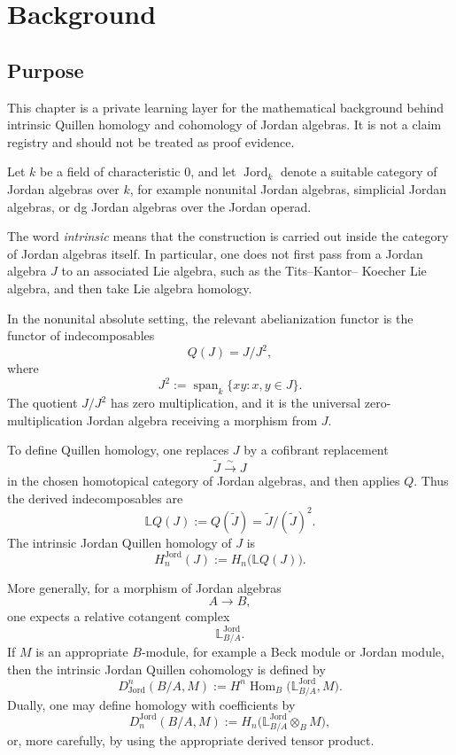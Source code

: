 \chapter{Background}

\section{Purpose}

This chapter is a private learning layer for the mathematical background behind
intrinsic Quillen homology and cohomology of Jordan algebras. It is not a claim
registry and should not be treated as proof evidence.

\begin{note}
  Let \(k\) be a field of characteristic \(0\), and let
  \(\operatorname{Jord}_k\) denote a suitable category of Jordan algebras over
  \(k\), for example nonunital Jordan algebras, simplicial Jordan algebras, or
  dg Jordan algebras over the Jordan operad.

  The word \emph{intrinsic} means that the construction is carried out inside the
  category of Jordan algebras itself. In particular, one does not first pass from
  a Jordan algebra \(J\) to an associated Lie algebra, such as the Tits--Kantor--
  Koecher Lie algebra, and then take Lie algebra homology.

  In the nonunital absolute setting, the relevant abelianization functor is the
  functor of indecomposables
  \[
      Q(J) = J/J^2,
  \]
  where
  \[
      J^2 := \operatorname{span}_k\{xy : x,y\in J\}.
  \]
  The quotient \(J/J^2\) has zero multiplication, and it is the universal
  zero-multiplication Jordan algebra receiving a morphism from \(J\).

  To define Quillen homology, one replaces \(J\) by a cofibrant replacement
  \[
      \widetilde{J} \xrightarrow{\sim} J
  \]
  in the chosen homotopical category of Jordan algebras, and then applies \(Q\).
  Thus the derived indecomposables are
  \[
      \mathbb{L}Q(J) := Q(\widetilde{J})
      = \widetilde{J}/(\widetilde{J})^2.
  \]
  The intrinsic Jordan Quillen homology of \(J\) is
  \[
      H^{\operatorname{Jord}}_n(J)
      :=
      H_n\bigl(\mathbb{L}Q(J)\bigr).
  \]

  More generally, for a morphism of Jordan algebras
  \[
      A \longrightarrow B,
  \]
  one expects a relative cotangent complex
  \[
      \mathbb{L}^{\operatorname{Jord}}_{B/A}.
  \]
  If \(M\) is an appropriate \(B\)-module, for example a Beck module or Jordan
  module, then the intrinsic Jordan Quillen cohomology is defined by
  \[
      D^n_{\operatorname{Jord}}(B/A,M)
      :=
      H^n\operatorname{Hom}_B
      \bigl(
          \mathbb{L}^{\operatorname{Jord}}_{B/A},
          M
      \bigr).
  \]
  Dually, one may define homology with coefficients by
  \[
      D^{\operatorname{Jord}}_n(B/A,M)
      :=
      H_n\bigl(
          \mathbb{L}^{\operatorname{Jord}}_{B/A}
          \otimes_B M
      \bigr),
  \]
  or, more carefully, by using the appropriate derived tensor product.


\end{note}
